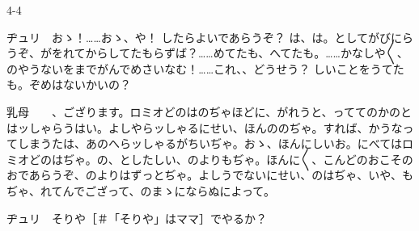 \documentclass[tate,paper=b6j,jafontsize=9pt]{jlreq}
\begin{document}
\begin{azconvIndented}{4\zw}{-4\zw}

ヂュリ　おゝ！……おゝ、や！ したらよいであらうぞ？ は、は。としてがびにらうぞ、がをれてからしてたもらずば？……めてたも、へてたも。……かなしや{〳〵}、のやうないをまでがんでめさいなむ！……これ、、どうせう？ しいことをうてたも。ぞめはないかいの？

乳母　　、ござります。ロミオどのはのぢゃほどに、がれうと、っててのかのとはッしゃらうはい。よしやらッしゃるにせい、ほんののぢゃ。すれば、かうなってしまうたは、あのへらッしゃるがちいぢゃ。おゝ、ほんにしいお。にべてはロミオどのはぢゃ。の、としたしい、のよりもぢゃ。ほんに{〳〵}、こんどのおこそのおであらうぞ、のよりはずっとぢゃ。よしうでないにせい、のはぢゃ、いや、もぢゃ、れてんでござって、のまゝにならぬによって。

ヂュリ　そりや{\small ［＃「そりや」はママ］}でやるか？


\end{azconvIndented}
\end{document}
